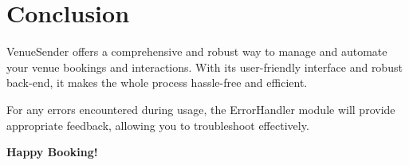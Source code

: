 \documentclass{article}
\begin{document}
\section{Conclusion}

VenueSender offers a comprehensive and robust way to manage and automate your venue bookings and interactions. With its user-friendly interface and robust back-end, it makes the whole process hassle-free and efficient.

For any errors encountered during usage, the ErrorHandler module will provide appropriate feedback, allowing you to troubleshoot effectively.

\textbf{Happy Booking!}
\end{document}
